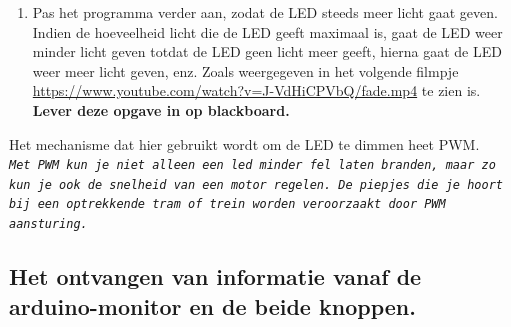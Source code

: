 \begin{enumerate}
 	\item  Pas het programma verder aan, zodat de LED steeds meer licht gaat geven. Indien de hoeveelheid licht die de LED geeft maximaal is, gaat de LED weer minder licht geven totdat de LED geen licht meer geeft, hierna gaat de LED weer meer licht geven, enz. Zoals weergegeven in het volgende filmpje\\  
 	\href{https://www.youtube.com/watch?v=J-VdHiCPVbQ/fade.mp4}{https://www.youtube.com/watch?v=J-VdHiCPVbQ/fade.mp4} te zien is.\\
 	\textbf{Lever deze opgave in op blackboard.}
   
  \end{enumerate}
 
 
 

 Het mechanisme dat hier gebruikt wordt om de LED te dimmen heet PWM.\\
{ \texttt{\textit{Met PWM kun je niet alleen een led minder fel laten branden, maar zo kun je ook de snelheid van een motor regelen. De piepjes die je hoort bij een optrekkende tram of trein worden veroorzaakt door PWM aansturing.}}}
 
 \subsection{Het ontvangen van informatie vanaf de arduino-monitor en de beide knoppen.}
 
